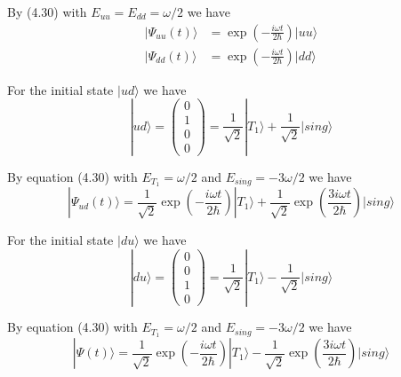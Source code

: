 \documentclass[12pt]{article}
\begin{document}
By (4.30) with $E_{uu}=E_{dd}=\omega/2$ we have
\begin{align*}
|\Psi_{uu}(t)\rangle&=\exp\left(-\frac{i\omega t}{2\hbar}\right)|uu\rangle
\\
|\Psi_{dd}(t)\rangle&=\exp\left(-\frac{i\omega t}{2\hbar}\right)|dd\rangle
\end{align*}

For the initial state $|ud\rangle$ we have
\begin{equation*}
|ud\rangle=\begin{pmatrix}0\\1\\0\\0\end{pmatrix}
=\frac{1}{\sqrt2}|T_1\rangle+\frac{1}{\sqrt2}|sing\rangle
\end{equation*}

By equation (4.30) with $E_{T_1}=\omega/2$ and $E_{sing}=-3\omega/2$ we have
\begin{equation*}
|\Psi_{ud}(t)\rangle=\frac{1}{\sqrt2}\exp\left(-\frac{i\omega t}{2\hbar}\right)|T_1\rangle
+\frac{1}{\sqrt2}\exp\left(\frac{3i\omega t}{2\hbar}\right)|sing\rangle
\end{equation*}

For the initial state $|du\rangle$ we have
\begin{equation*}
|du\rangle=\begin{pmatrix}0\\0\\1\\0\end{pmatrix}
=\frac{1}{\sqrt2}|T_1\rangle-\frac{1}{\sqrt2}|sing\rangle
\end{equation*}

By equation (4.30) with $E_{T_1}=\omega/2$ and $E_{sing}=-3\omega/2$ we have
\begin{equation*}
|\Psi(t)\rangle=\frac{1}{\sqrt2}\exp\left(-\frac{i\omega t}{2\hbar}\right)|T_1\rangle
-\frac{1}{\sqrt2}\exp\left(\frac{3i\omega t}{2\hbar}\right)|sing\rangle
\end{equation*}
\end{document}
